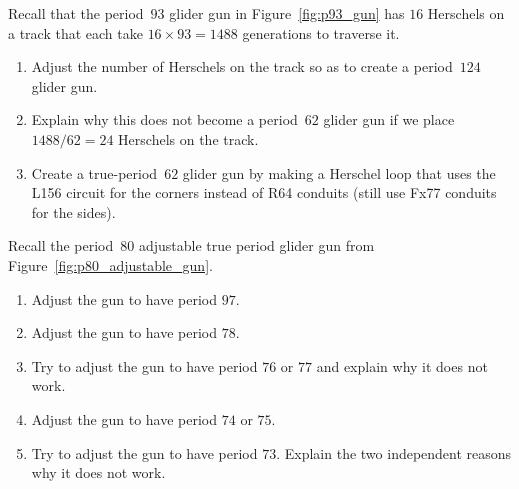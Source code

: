 \begin{multicols}{2}
	
	\mfilbreak
	
	
	\begin{problem}\label{exer:p62_gun_problem}
		Recall that the period~$93$ glider gun in Figure~\ref{fig:p93_gun} has $16$ Herschels on a track that each take $16 \times 93 = 1488$ generations to traverse it.\smallskip
		
		\begin{enumerate}[label=\bf\color{ocre}(\alph*)]
			\item Adjust the number of Herschels on the track so as to create a period~$124$ glider gun.
			
			\item Explain why this does not become a period~$62$ glider gun if we place $1488/62 = 24$ Herschels on the track. %
			
			\item Create a true-period~$62$ glider gun by making a Herschel loop that uses the L156 circuit for the corners instead of R64 conduits (still use Fx77 conduits for the sides).
		\end{enumerate}
	\end{problem}
	
	
	\mfilbreak
	
	
	\begin{problem}\label{exer:p80_adjustable_manipulate}
		Recall the period~$80$ adjustable true period glider gun from Figure~\ref{fig:p80_adjustable_gun}.\smallskip
		
		\begin{enumerate}[label=\bf\color{ocre}(\alph*)]
			\item Adjust the gun to have period $97$.
			
			\item Adjust the gun to have period $78$.
			
			\item Try to adjust the gun to have period $76$ or $77$ and explain why it does not work.
			
			\item Adjust the gun to have period $74$ or $75$.
			
			\item Try to adjust the gun to have period $73$. Explain the two independent reasons why it does not work.
		\end{enumerate}
	\end{problem}
	
	
	\mfilbreak
	

\end{multicols}
